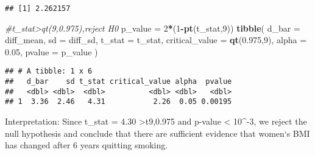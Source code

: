 \documentclass[]{article}
\newenvironment{Shaded}{\begin{snugshade}}{\end{snugshade}}
\newcommand{\KeywordTok}[1]{\textcolor[rgb]{0.13,0.29,0.53}{\textbf{#1}}}
\newcommand{\DataTypeTok}[1]{\textcolor[rgb]{0.13,0.29,0.53}{#1}}
\newcommand{\DecValTok}[1]{\textcolor[rgb]{0.00,0.00,0.81}{#1}}
\newcommand{\FloatTok}[1]{\textcolor[rgb]{0.00,0.00,0.81}{#1}}
\newcommand{\StringTok}[1]{\textcolor[rgb]{0.31,0.60,0.02}{#1}}
\newcommand{\CommentTok}[1]{\textcolor[rgb]{0.56,0.35,0.01}{\textit{#1}}}
\newcommand{\OperatorTok}[1]{\textcolor[rgb]{0.81,0.36,0.00}{\textbf{#1}}}
\newcommand{\NormalTok}[1]{#1}
\begin{document}
\begin{Shaded}
\end{Shaded}

\begin{verbatim}
## [1] 2.262157
\end{verbatim}

\begin{Shaded}
\begin{Highlighting}[]
  \CommentTok{#t_stat>qt(9,0.975),reject H0}
\NormalTok{  p_value =}\StringTok{ }\DecValTok{2}\OperatorTok{*}\NormalTok{(}\DecValTok{1}\OperatorTok{-}\KeywordTok{pt}\NormalTok{(t_stat,}\DecValTok{9}\NormalTok{))}
  \KeywordTok{tibble}\NormalTok{(}
    \DataTypeTok{d_bar =}\NormalTok{ diff_mean,}
    \DataTypeTok{sd =}\NormalTok{ diff_sd,}
    \DataTypeTok{t_stat =}\NormalTok{ t_stat,}
    \DataTypeTok{critical_value =} \KeywordTok{qt}\NormalTok{(}\FloatTok{0.975}\NormalTok{,}\DecValTok{9}\NormalTok{),}
    \DataTypeTok{alpha =} \FloatTok{0.05}\NormalTok{,}
    \DataTypeTok{pvalue =}\NormalTok{ p_value}
\NormalTok{  )}
\end{Highlighting}
\end{Shaded}

\begin{verbatim}
## # A tibble: 1 x 6
##   d_bar    sd t_stat critical_value alpha  pvalue
##   <dbl> <dbl>  <dbl>          <dbl> <dbl>   <dbl>
## 1  3.36  2.46   4.31           2.26  0.05 0.00195
\end{verbatim}

Interpretation: Since t\_stat = 4.30 \textgreater{}t9,0.975 and p-value
\textless{} 10\^{}-3, we reject the null hypothesis and conclude that
there are sufficient evidence that women`s BMI has changed after 6 years
quitting smoking.
\end{document}
